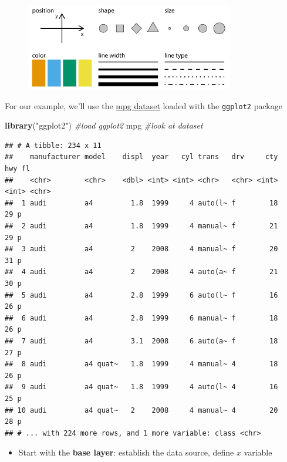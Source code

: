 \documentclass[]{book}
\newenvironment{Shaded}{\begin{snugshade}}{\end{snugshade}}
\newcommand{\KeywordTok}[1]{\textcolor[rgb]{0.13,0.29,0.53}{\textbf{#1}}}
\newcommand{\StringTok}[1]{\textcolor[rgb]{0.31,0.60,0.02}{#1}}
\newcommand{\CommentTok}[1]{\textcolor[rgb]{0.56,0.35,0.01}{\textit{#1}}}
\newcommand{\NormalTok}[1]{#1}
\providecommand{\tightlist}{%
  \setlength{\itemsep}{0pt}\setlength{\parskip}{0pt}}
\theoremstyle{definition}
\theoremstyle{definition}
\theoremstyle{definition}
\theoremstyle{remark}
\begin{document}
\begin{figure}
\centering
\includegraphics[height=1.50000in]{images/ggplotaes.png}
\caption{}
\end{figure}

For our example, we'll use the
\href{https://ggplot2.tidyverse.org/reference/mpg.html}{mpg dataset}
loaded with the \texttt{ggplot2} package

\begin{Shaded}
\begin{Highlighting}[]
\KeywordTok{library}\NormalTok{(}\StringTok{"ggplot2"}\NormalTok{) }\CommentTok{#load ggplot2}
\NormalTok{mpg }\CommentTok{#look at dataset}
\end{Highlighting}
\end{Shaded}

\begin{verbatim}
## # A tibble: 234 x 11
##    manufacturer model    displ  year   cyl trans   drv     cty   hwy fl   
##    <chr>        <chr>    <dbl> <int> <int> <chr>   <chr> <int> <int> <chr>
##  1 audi         a4         1.8  1999     4 auto(l~ f        18    29 p    
##  2 audi         a4         1.8  1999     4 manual~ f        21    29 p    
##  3 audi         a4         2    2008     4 manual~ f        20    31 p    
##  4 audi         a4         2    2008     4 auto(a~ f        21    30 p    
##  5 audi         a4         2.8  1999     6 auto(l~ f        16    26 p    
##  6 audi         a4         2.8  1999     6 manual~ f        18    26 p    
##  7 audi         a4         3.1  2008     6 auto(a~ f        18    27 p    
##  8 audi         a4 quat~   1.8  1999     4 manual~ 4        18    26 p    
##  9 audi         a4 quat~   1.8  1999     4 auto(l~ 4        16    25 p    
## 10 audi         a4 quat~   2    2008     4 manual~ 4        20    28 p    
## # ... with 224 more rows, and 1 more variable: class <chr>
\end{verbatim}

\begin{itemize}
\tightlist
\item
  Start with the \textbf{base layer}: establish the data source, define
  \(x\) variable
\end{itemize}
\end{document}
